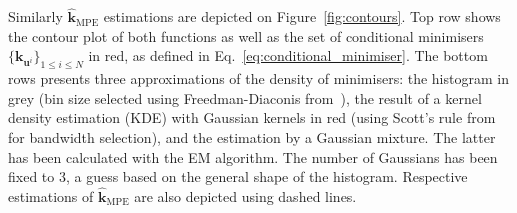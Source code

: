 \documentclass[preprint, 1p]{elsarticle}
\newcommand{\hatkmpe}{\hat{\mathbf{k}}_{\mathrm{MPE}}}
\begin{document}
Similarly $\hatkmpe$ estimations are depicted on Figure~\ref{fig:contours}.  Top row shows the contour plot of both functions as well as the set of conditional minimisers $\{\mathbf{k}_{\mathbf{u}^i}\}_{1\leq i \leq N}$ in red, as defined in Eq.~\eqref{eq:conditional_minimiser}.
The bottom rows presents three approximations of the density of minimisers: the histogram in grey (bin size selected using Freedman-Diaconis from~\cite{freedman_histogram_1981}), the result of a kernel density estimation (KDE) with Gaussian kernels in red (using Scott's rule from~\cite{scott_optimal_1979} for bandwidth selection), and the estimation by a Gaussian mixture. The latter has been calculated with the EM algorithm. The number of Gaussians has been fixed to 3, a guess based on the general shape of the histogram. Respective estimations of $\hatkmpe$ are also depicted using dashed lines. 



\end{document}
